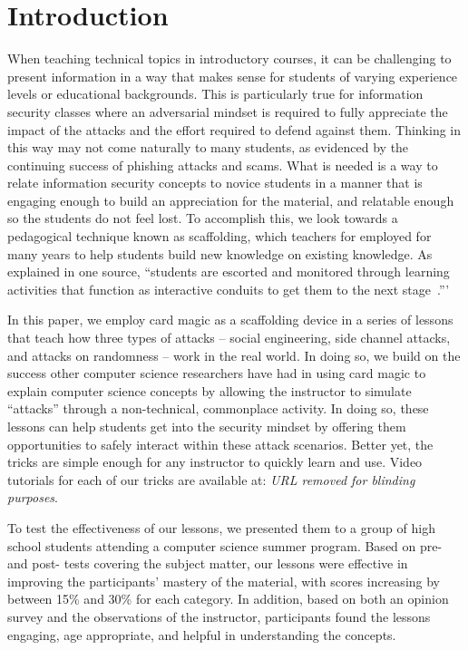 \section{Introduction}
\label{SEC:introduction}

When teaching technical topics
in introductory courses,
it can be challenging
to present information
in a way that makes sense 
for students of varying
experience levels
or educational backgrounds.
This is particularly true
for information security classes
where an adversarial mindset
is required
to fully appreciate the impact of the attacks and the effort required to
defend against them.
Thinking in this way
may not come naturally
to many students,
as evidenced
by the continuing success of phishing attacks
and scams.
What is needed
is a way
to relate information security concepts
to novice students
in a manner
that is engaging enough
to build an appreciation for the material,
and relatable enough so the students do not feel lost.
To accomplish this, we look towards a pedagogical technique known as scaffolding, which teachers for employed for many years to help students build
new knowledge on existing knowledge.
As explained in one source,
``students are escorted and monitored through learning
activities that function as interactive conduits to get
them to the next stage~\cite{raymond2000}.'''

In this paper, 
we employ card magic as a scaffolding device in a series of lessons that teach how three types
of attacks -- social engineering, side channel attacks, and attacks on
randomness -- work in the real world. In doing so, we build on the
success other computer science researchers have had 
in using card magic
to explain computer science concepts by allowing the instructor to simulate “attacks” through a non-technical, commonplace activity. In doing so, these lessons can help students get into the security mindset by offering them opportunities
to safely interact within these attack scenarios.
Better yet, the tricks are simple enough for any instructor to quickly learn and use.
Video tutorials for each of our tricks are available at: \textit{URL removed
for blinding purposes}.

To test the effectiveness of our lessons, we presented them to
a group of high school students
attending a computer science summer program.
Based on pre- and post- tests covering the
subject matter, our lessons were effective 
in improving the participants' mastery of the material,
with scores
increasing by between 15\% and 30\% for each category. In addition, based on both an opinion survey and the observations of the instructor, 
participants found the lessons engaging, age appropriate, and helpful in understanding the concepts.


